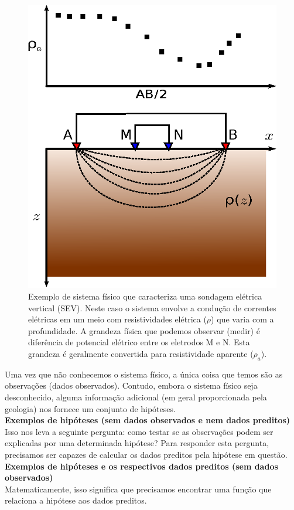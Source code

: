 \begin{figure}
    \centering
    \includegraphics[scale=1]{../figs/system-sev.eps}
    \caption{Exemplo de sistema físico que caracteriza uma sondagem elétrica
        vertical (SEV). Neste caso o sistema envolve a condução de correntes
        elétricas em um meio com resistividades elétrica ($\rho$) que varia com
        a profundidade.
        A grandeza física que podemos observar (medir) é diferência de potencial
        elétrico entre os eletrodos M e N. Esta grandeza é geralmente convertida
        para resistividade aparente ($\rho_a$).}
    \label{system-sev}
\end{figure}

\indent Uma vez que não conhecemos o sistema físico, a única coisa que temos são as
observações (dados observados). Contudo, embora o sistema físico seja
desconhecido, alguma informação adicional (em geral proporcionada pela geologia)
nos fornece um conjunto de hipóteses.
\\
{\bf Exemplos de hipóteses (sem dados observados e nem dados preditos)}
\\
\indent Isso nos leva a seguinte pergunta: como testar se as observações podem ser
explicadas por uma determinada hipótese? Para responder esta pergunta,
precisamos ser capazes de calcular os dados preditos pela hipótese em questão.
\\
{\bf Exemplos de hipóteses e os respectivos dados preditos (sem dados observados)}
\\
\indent Matematicamente, isso significa que precisamos encontrar uma função que
relaciona a hipótese aos dados preditos.

